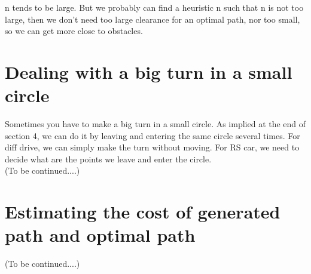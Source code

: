 \documentclass[12pt]{article}
\begin{document}
  n tends to be large. But we probably can find a heuristic n such that n is not too large, then we don't need too large clearance for an optimal path, nor too small, so we can get more close to obstacles.
  
  \section{Dealing with a big turn in a small circle }
  
  Sometimes you have to make a big turn in a small circle. As implied at the end of section 4, we can do it by leaving and entering the same circle several times. For diff drive, we can simply make the turn without moving. For RS car, we need to decide what are the points we leave and enter the circle.\\
  
  (To be continued....)
  
  \section{Estimating the cost of generated path and optimal path}
  
  (To be continued....)
\end{document}
